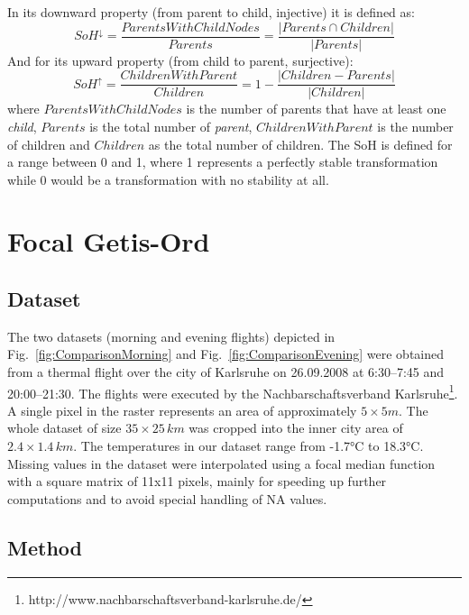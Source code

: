 \documentclass{itatnew}
\begin{document}
In its downward property (from parent to child, injective) it is defined as:
\begin{equation}
\label{eq:SoH-down}
SoH^\downarrow = \frac{ParentsWithChildNodes}{Parents} = \frac{|Parents \cap 
Children|}{|Parents|}
\end{equation}
And for its upward property (from child to parent, surjective):
\begin{equation}
\label{eq:SoH-up}
SoH^\uparrow = \frac{ChildrenWithParent}{Children} = 1 - \frac{|Children - 
Parents|}{|Children|}
\end{equation}
where $ParentsWithChildNodes$ is the number of parents that have at least one 
\emph{child}, $Parents$ is the total number of \emph{parent}, 
$ChildrenWithParent$ is the number of children and $Children$ as the total 
number of children.
The SoH is defined for a range between 0 and 1, where 1 represents a perfectly 
stable transformation while 0 would be a transformation with no stability at 
all.

\section{Focal Getis-Ord} \label{sec:FocalGetisOrd}

\subsection{Dataset}

The two datasets (morning and evening flights) depicted in
Fig.~\ref{fig:ComparisonMorning} and Fig.~\ref{fig:ComparisonEvening} were
obtained from a thermal flight over the city of Karlsruhe on 26.09.2008 at
6:30--7:45 and 20:00--21:30. The flights were executed by the
Nachbarschaftsverband
Karlsruhe\footnote{http://www.nachbarschaftsverband-karlsruhe.de/}. A single
pixel in the raster represents an area of approximately $5{\times}5m$. The whole
dataset of size $35{\times}25\,km$ was cropped into the inner city area of
$2.4{\times}1.4\,km$. %
The temperatures in our dataset range from -1.7°C to 18.3°C.
Missing values in the dataset were interpolated using a focal median function
with a square matrix of 11x11 pixels, mainly for speeding up further
computations and to avoid special handling of NA values.


\subsection{Method}
\end{document}
